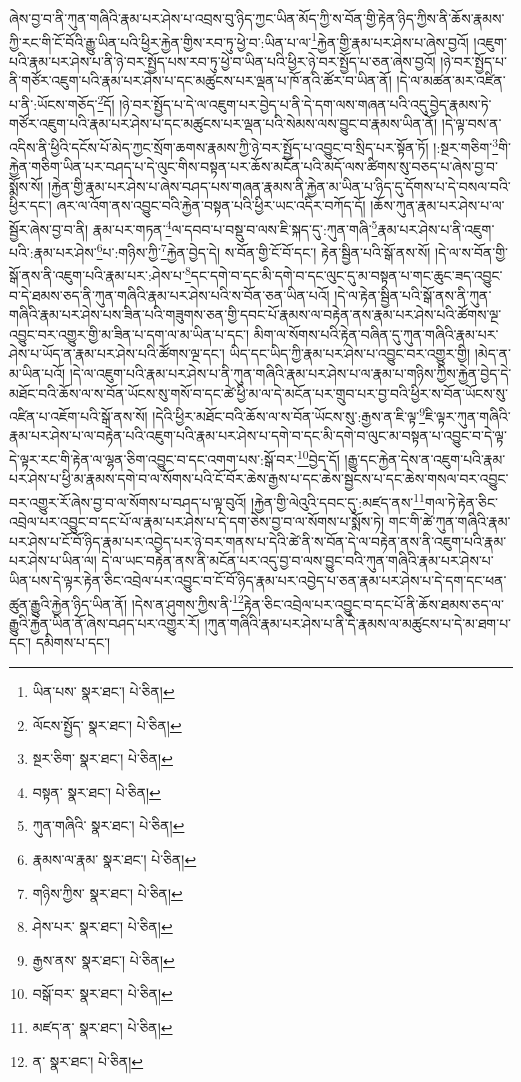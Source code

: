 ཞེས་བྱ་བ་ནི་ཀུན་གཞིའི་རྣམ་པར་ཤེས་པ་འབྲས་བུ་ཉིད་ཀྱང་ཡིན་མོད་ཀྱི་ས་བོན་གྱི་རྟེན་ཉིད་ཀྱིས་ནི་ཆོས་རྣམས་ཀྱི་རང་གི་ངོ་བོའི་རྒྱུ་ཡིན་པའི་ཕྱིར་རྐྱེན་གྱིས་རབ་ཏུ་ཕྱེ་བ་:ཡིན་པ་ལ་\footnote{ཡིན་པས་  སྣར་ཐང་།  པེ་ཅིན། }རྐྱེན་གྱི་རྣམ་པར་ཤེས་པ་ཞེས་བྱའོ། །འཇུག་པའི་རྣམ་པར་ཤེས་པ་ནི་ཉེ་བར་སྤྱོད་པས་རབ་ཏུ་ཕྱེ་བ་ཡིན་པའི་ཕྱིར་ཉེ་བར་སྤྱོད་པ་ཅན་ཞེས་བྱའོ། །ཉེ་བར་སྤྱོད་པ་ནི་གཙོར་འཇུག་པའི་རྣམ་པར་ཤེས་པ་དང་མཚུངས་པར་ལྡན་པ་ཁོ་ནའི་ཚོར་བ་ཡིན་ནོ། །དེ་ལ་མཚན་མར་འཛིན་པ་ནི་:ཡོངས་གཅོད་\footnote{ལོངས་སྤྱོད་  སྣར་ཐང་།  པེ་ཅིན། }དོ། །ཉེ་བར་སྤྱོད་པ་དེ་ལ་འཇུག་པར་བྱེད་པ་ནི་དེ་དག་ལས་གཞན་པའི་འདུ་བྱེད་རྣམས་ཏེ་གཙོར་འཇུག་པའི་རྣམ་པར་ཤེས་པ་དང་མཚུངས་པར་ལྡན་པའི་སེམས་ལས་བྱུང་བ་རྣམས་ཡིན་ནོ། །དེ་ལྟ་བས་ན་འདིས་ནི་ཕྱིའི་དངོས་པོ་མེད་ཀྱང་སྲོག་ཆགས་རྣམས་ཀྱི་ཉེ་བར་སྤྱོད་པ་འབྱུང་བ་སྲིད་པར་སྟོན་ཏོ། །:སྔར་གཅིག་\footnote{སྔར་ཅིག་  སྣར་ཐང་།  པེ་ཅིན། }གི་རྐྱེན་གཅིག་ཡིན་པར་བཤད་པ་དེ་ལུང་གིས་བསྟན་པར་ཆོས་མངོན་པའི་མདོ་ལས་ཚིགས་སུ་བཅད་པ་ཞེས་བྱ་བ་སྨོས་སོ། །རྐྱེན་གྱི་རྣམ་པར་ཤེས་པ་ཞེས་བཤད་པས་གཞན་རྣམས་ནི་རྐྱེན་མ་ཡིན་པ་ཉིད་དུ་དོགས་པ་དེ་བསལ་བའི་ཕྱིར་དང་། ཞར་ལ་འོག་ནས་འབྱུང་བའི་རྐྱེན་བསྟན་པའི་ཕྱིར་ཡང་འདིར་བཀོད་དོ། །ཆོས་ཀུན་རྣམ་པར་ཤེས་པ་ལ་སྦྱོར་ཞེས་བྱ་བ་ནི། རྣམ་པར་གཏན་\footnote{བསྟན་  སྣར་ཐང་།  པེ་ཅིན། }ལ་དབབ་པ་བསྡུ་བ་ལས་ཇི་སྐད་དུ་:ཀུན་གཞི་\footnote{ཀུན་གཞིའི་  སྣར་ཐང་།  པེ་ཅིན། }རྣམ་པར་ཤེས་པ་ནི་འཇུག་པའི་:རྣམ་པར་ཤེས་\footnote{རྣམས་ལ་རྣམ་  སྣར་ཐང་།  པེ་ཅིན། }པ་:གཉིས་ཀྱི་\footnote{གཉིས་ཀྱིས་  སྣར་ཐང་།  པེ་ཅིན། }རྐྱེན་བྱེད་དེ། ས་བོན་གྱི་ངོ་བོ་དང་། རྟེན་སྦྱིན་པའི་སྒོ་ནས་སོ། །དེ་ལ་ས་བོན་གྱི་སྒོ་ནས་ནི་འཇུག་པའི་རྣམ་པར་:ཤེས་པ་\footnote{ཤེས་པར་  སྣར་ཐང་།  པེ་ཅིན། }དང་དགེ་བ་དང་མི་དགེ་བ་དང་ལུང་དུ་མ་བསྟན་པ་གང་ཆུང་ཟད་འབྱུང་བ་དེ་ཐམས་ཅད་ནི་ཀུན་གཞིའི་རྣམ་པར་ཤེས་པའི་ས་བོན་ཅན་ཡིན་པའོ། །དེ་ལ་རྟེན་སྦྱིན་པའི་སྒོ་ནས་ནི་ཀུན་གཞིའི་རྣམ་པར་ཤེས་པས་ཟིན་པའི་གཟུགས་ཅན་གྱི་དབང་པོ་རྣམས་ལ་བརྟེན་ནས་རྣམ་པར་ཤེས་པའི་ཚོགས་ལྔ་འབྱུང་བར་འགྱུར་གྱི་མ་ཟིན་པ་དག་ལ་མ་ཡིན་པ་དང་། མིག་ལ་སོགས་པའི་རྟེན་བཞིན་དུ་ཀུན་གཞིའི་རྣམ་པར་ཤེས་པ་ཡོད་ན་རྣམ་པར་ཤེས་པའི་ཚོགས་ལྔ་དང་། ཡིད་དང་ཡིད་ཀྱི་རྣམ་པར་ཤེས་པ་འབྱུང་བར་འགྱུར་གྱི། །མེད་ན་མ་ཡིན་པའོ། །དེ་ལ་འཇུག་པའི་རྣམ་པར་ཤེས་པ་ནི་ཀུན་གཞིའི་རྣམ་པར་ཤེས་པ་ལ་རྣམ་པ་གཉིས་ཀྱིས་རྐྱེན་བྱེད་དེ་མཐོང་བའི་ཆོས་ལ་ས་བོན་ཡོངས་སུ་གསོ་བ་དང་ཚེ་ཕྱི་མ་ལ་དེ་མངོན་པར་གྲུབ་པར་བྱ་བའི་ཕྱིར་ས་བོན་ཡོངས་སུ་འཛིན་པ་འཇོག་པའི་སྒོ་ནས་སོ། །དེའི་ཕྱིར་མཐོང་བའི་ཆོས་ལ་ས་བོན་ཡོངས་སུ་:རྒྱས་ན་ཇི་ལྟ་\footnote{རྒྱས་ནས་  སྣར་ཐང་།  པེ་ཅིན། }ཇི་ལྟར་ཀུན་གཞིའི་རྣམ་པར་ཤེས་པ་ལ་བརྟེན་པའི་འཇུག་པའི་རྣམ་པར་ཤེས་པ་དགེ་བ་དང་མི་དགེ་བ་ལུང་མ་བསྟན་པ་འབྱུང་བ་དེ་ལྟ་དེ་ལྟར་རང་གི་རྟེན་ལ་ལྷན་ཅིག་འབྱུང་བ་དང་འགག་པས་:སྒོ་བར་\footnote{བསྒོ་བར་  སྣར་ཐང་།  པེ་ཅིན། }བྱེད་དོ། །རྒྱུ་དང་རྐྱེན་དེས་ན་འཇུག་པའི་རྣམ་པར་ཤེས་པ་ཕྱི་མ་རྣམས་དགེ་བ་ལ་སོགས་པའི་ངོ་བོར་ཆེས་རྒྱས་པ་དང་ཆེས་སྦྱངས་པ་དང་ཆེས་གསལ་བར་འབྱུང་བར་འགྱུར་རོ་ཞེས་བྱ་བ་ལ་སོགས་པ་བཤད་པ་ལྟ་བུའོ། །རྐྱེན་གྱི་ལེའུའི་དབང་དུ་:མཛད་ནས་\footnote{མཛད་ན་  སྣར་ཐང་།  པེ་ཅིན། }གལ་ཏེ་རྟེན་ཅིང་འབྲེལ་པར་འབྱུང་བ་དང་པོ་ལ་རྣམ་པར་ཤེས་པ་དེ་དག་ཅེས་བྱ་བ་ལ་སོགས་པ་སྨོས་ཏེ། གང་གི་ཚེ་ཀུན་གཞིའི་རྣམ་པར་ཤེས་པ་ངོ་བོ་ཉིད་རྣམ་པར་འབྱེད་པར་ཉེ་བར་གནས་པ་དེའི་ཚེ་ནི་ས་བོན་དེ་ལ་བརྟེན་ནས་ནི་འཇུག་པའི་རྣམ་པར་ཤེས་པ་ཡིན་ལ། དེ་ལ་ཡང་བརྟེན་ནས་ནི་མངོན་པར་འདུ་བྱ་བ་ལས་བྱུང་བའི་ཀུན་གཞིའི་རྣམ་པར་ཤེས་པ་ཡིན་པས་དེ་ལྟར་རྟེན་ཅིང་འབྲེལ་པར་འབྱུང་བ་ངོ་བོ་ཉིད་རྣམ་པར་འབྱེད་པ་ཅན་རྣམ་པར་ཤེས་པ་དེ་དག་དང་ཕན་ཚུན་རྒྱུའི་རྐྱེན་ཉིད་ཡིན་ནོ། །དེས་ན་ཤུགས་ཀྱིས་ནི་\footnote{ན་  སྣར་ཐང་།  པེ་ཅིན། }རྟེན་ཅིང་འབྲེལ་པར་འབྱུང་བ་དང་པོ་ནི་ཆོས་ཐམས་ཅད་ལ་རྒྱུའི་རྐྱེན་ཡིན་ནོ་ཞེས་བཤད་པར་འགྱུར་རོ། །ཀུན་གཞིའི་རྣམ་པར་ཤེས་པ་ནི་དེ་རྣམས་ལ་མཚུངས་པ་དེ་མ་ཐག་པ་དང་། དམིགས་པ་དང་། 
